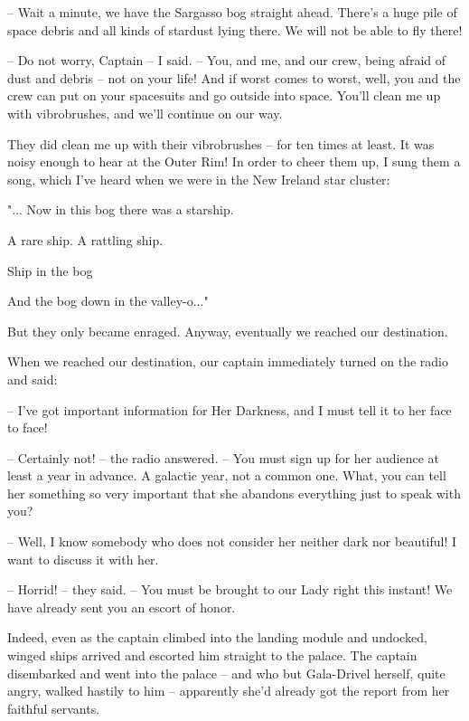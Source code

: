 \documentclass[ebook,twoside,final,openright]{memoir}
\begin{document}
– Wait a minute, we have the Sargasso bog straight ahead. There's a huge pile of space debris and all kinds of stardust lying there. We will not be able to fly there!\par
– Do not worry, Captain – I said. – You, and me, and our crew, being afraid of dust and debris – not on your life! And if worst comes to worst, well, you and the crew can put on your spacesuits and go outside into space. You’ll clean me up with vibrobrushes, and we’ll continue on our way.\par
\par
They did clean me up with their vibrobrushes – for ten times at least. It was noisy enough to hear at the Outer Rim! In order to cheer them up, I sung them a song, which I’ve heard when we were in the New Ireland star cluster: \par
"... Now in this bog there was a starship.\par
A rare ship. A rattling ship.\par
Ship in the bog\par
And the bog down in the valley-o..."\par
 But they only became enraged. Anyway, eventually we reached our destination.\par
\par
When we reached our destination, our captain immediately turned on the radio and said:\par
– I've got important information for Her Darkness, and I must tell it to her face to face!\par
– Certainly not! – the radio answered. – You must sign up for her audience at least a year in advance. A galactic year, not a common one. What, you can tell her something so very important that she abandons everything just to speak with you?\par
– Well, I know somebody who does not consider her neither dark nor beautiful! I want to discuss it with her.\par
– Horrid! – they said. – You must be brought to our Lady right this instant! We have already sent you an escort of honor.\par
\par
Indeed, even as the captain climbed into the landing module and undocked, winged ships arrived and escorted him straight to the palace. The captain disembarked and went into the palace – and who but Gala-Drivel herself, quite angry, walked hastily to him – apparently she’d already got the report from her faithful servants.\par
\end{document}

